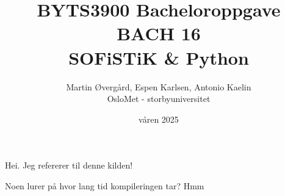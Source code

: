 \documentclass[12pt, norsk]{article}
\title{BYTS3900 Bacheloroppgave \\ BACH 16\\SOFiSTiK \& Python}
\author{Martin Øvergård, Espen Karlsen, Antonio Kaelin\\OsloMet - storbyuniversitet}
\date{våren 2025}
\begin{document}
\maketitle

Hei. Jeg refererer til denne kilden! \parencite[s. 27]{testreferanse}


Noen lurer på hvor lang tid kompileringen tar? Hmm





\printbibliography
\end{document}
